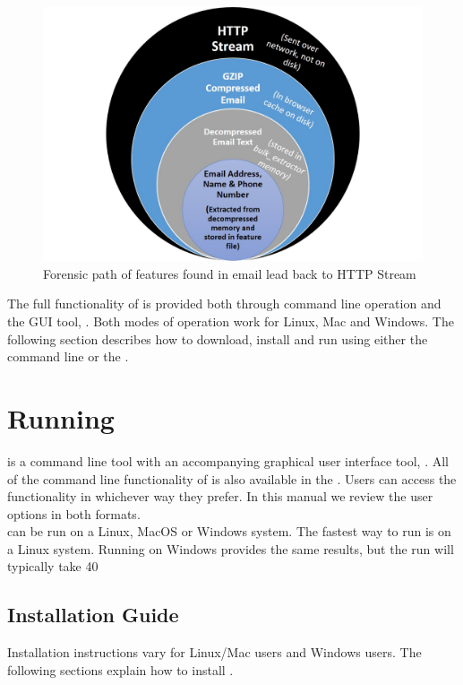 \documentclass[11pt]{article} %
\begin{document}
\begin{figure}
	\center
	\includegraphics[scale=.60]{otherPics/forensicPath.jpg}
	\caption{Forensic path of features found in email lead back to HTTP Stream}
	\label{fig:forensicPath}
\end{figure}


The full functionality of \bulk is provided both through command line operation and the GUI tool, \viewer.  Both modes of operation work for Linux, Mac and Windows.  The following section describes how to download, install and run \bulk using either the command line or the \viewer.

\section{Running \bulk}
\bulk is a command line tool with an accompanying graphical user interface tool, \viewer. All of the command line functionality of \bulk is also available in the \viewer. Users can access the functionality in whichever way they prefer. In this manual we review the \bulk user options in both formats.\\

\bulk can be run on a Linux, MacOS or Windows system. The fastest way to run \bulk is on a Linux system.  Running on Windows provides the same results, but the run will typically take 40%


\subsection{Installation Guide}
Installation instructions vary for Linux/Mac users and Windows users. The following sections explain how to install \bulk.
\end{document}
